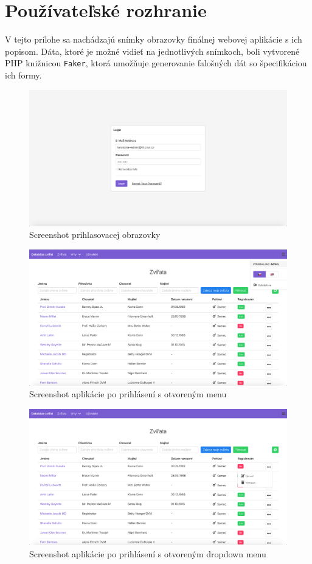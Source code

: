 \chapter{Používateľské rozhranie}
V tejto prílohe sa nachádzajú snímky obrazovky finálnej webovej aplikácie s ich popisom. Dáta, ktoré je možné vidieť na jednotlivých snímkoch, boli vytvorené PHP knižnicou \texttt{Faker}, ktorá umožňuje generovanie falošných dát so špecifikáciou ich formy.

\begin{figure}[H]
	\includegraphics[width=1.0\textwidth]{media/priloha/vseobecne/1.png}
	\caption{Screenshot prihlasovacej obrazovky}
\end{figure}

\begin{figure}[H]
	\includegraphics[width=1.0\textwidth]{media/priloha/vseobecne/2.png}
	\caption{Screenshot aplikácie po prihlásení s otvoreným menu}
\end{figure}

\begin{figure}[H]
	\includegraphics[width=1.0\textwidth]{media/priloha/vseobecne/3.png}
	\caption{Screenshot aplikácie po prihlásení s otvoreným dropdown menu}
\end{figure}

